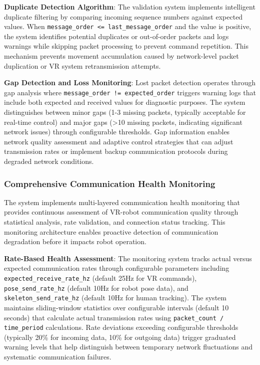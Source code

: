 \textbf{Duplicate Detection Algorithm}: The validation system implements intelligent duplicate filtering by comparing incoming sequence numbers against expected values. When \texttt{message\_order <= last\_message\_order} and the value is positive, the system identifies potential duplicates or out-of-order packets and logs warnings while skipping packet processing to prevent command repetition. This mechanism prevents movement accumulation caused by network-level packet duplication or VR system retransmission attempts.

\textbf{Gap Detection and Loss Monitoring}: Lost packet detection operates through gap analysis where \texttt{message\_order != expected\_order} triggers warning logs that include both expected and received values for diagnostic purposes. The system distinguishes between minor gaps (1-3 missing packets, typically acceptable for real-time control) and major gaps (>10 missing packets, indicating significant network issues) through configurable thresholds. Gap information enables network quality assessment and adaptive control strategies that can adjust transmission rates or implement backup communication protocols during degraded network conditions.

\subsubsection{Comprehensive Communication Health Monitoring}

The system implements multi-layered communication health monitoring that provides continuous assessment of VR-robot communication quality through statistical analysis, rate validation, and connection status tracking. This monitoring architecture enables proactive detection of communication degradation before it impacts robot operation.

\textbf{Rate-Based Health Assessment}: The monitoring system tracks actual versus expected communication rates through configurable parameters including \texttt{expected\_receive\_rate\_hz} (default 25Hz for VR commands), \texttt{pose\_send\_rate\_hz} (default 10Hz for robot pose data), and \texttt{skeleton\_send\_rate\_hz} (default 10Hz for human tracking). The system maintains sliding-window statistics over configurable intervals (default 10 seconds) that calculate actual transmission rates using \texttt{packet\_count / time\_period} calculations. Rate deviations exceeding configurable thresholds (typically 20\% for incoming data, 10\% for outgoing data) trigger graduated warning levels that help distinguish between temporary network fluctuations and systematic communication failures.

